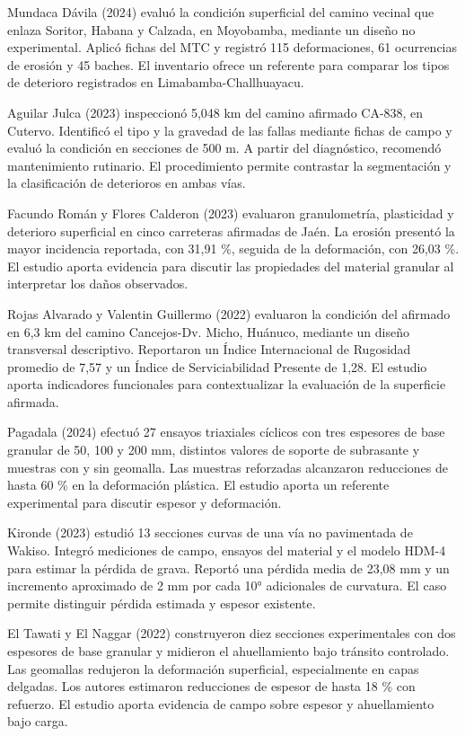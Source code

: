 \documentclass[12pt,a4paper]{article}
\begin{document}
Mundaca Dávila (2024) evaluó la condición superficial del camino vecinal que enlaza Soritor, Habana y Calzada, en Moyobamba, mediante un diseño no experimental. Aplicó fichas del MTC y registró 115 deformaciones, 61 ocurrencias de erosión y 45 baches. El inventario ofrece un referente para comparar los tipos de deterioro registrados en Limabamba-Challhuayacu.

Aguilar Julca (2023) inspeccionó 5,048 km del camino afirmado CA-838, en Cutervo. Identificó el tipo y la gravedad de las fallas mediante fichas de campo y evaluó la condición en secciones de 500 m. A partir del diagnóstico, recomendó mantenimiento rutinario. El procedimiento permite contrastar la segmentación y la clasificación de deterioros en ambas vías.

Facundo Román y Flores Calderon (2023) evaluaron granulometría, plasticidad y deterioro superficial en cinco carreteras afirmadas de Jaén. La erosión presentó la mayor incidencia reportada, con 31,91 \%, seguida de la deformación, con 26,03 \%. El estudio aporta evidencia para discutir las propiedades del material granular al interpretar los daños observados.

Rojas Alvarado y Valentin Guillermo (2022) evaluaron la condición del afirmado en 6,3 km del camino Cancejos-Dv. Micho, Huánuco, mediante un diseño transversal descriptivo. Reportaron un Índice Internacional de Rugosidad promedio de 7,57 y un Índice de Serviciabilidad Presente de 1,28. El estudio aporta indicadores funcionales para contextualizar la evaluación de la superficie afirmada.

Pagadala (2024) efectuó 27 ensayos triaxiales cíclicos con tres espesores de base granular de 50, 100 y 200 mm, distintos valores de soporte de subrasante y muestras con y sin geomalla. Las muestras reforzadas alcanzaron reducciones de hasta 60 \% en la deformación plástica. El estudio aporta un referente experimental para discutir espesor y deformación.

Kironde (2023) estudió 13 secciones curvas de una vía no pavimentada de Wakiso. Integró mediciones de campo, ensayos del material y el modelo HDM-4 para estimar la pérdida de grava. Reportó una pérdida media de 23,08 mm y un incremento aproximado de 2 mm por cada 10° adicionales de curvatura. El caso permite distinguir pérdida estimada y espesor existente.

El Tawati y El Naggar (2022) construyeron diez secciones experimentales con dos espesores de base granular y midieron el ahuellamiento bajo tránsito controlado. Las geomallas redujeron la deformación superficial, especialmente en capas delgadas. Los autores estimaron reducciones de espesor de hasta 18 \% con refuerzo. El estudio aporta evidencia de campo sobre espesor y ahuellamiento bajo carga.
\end{document}
